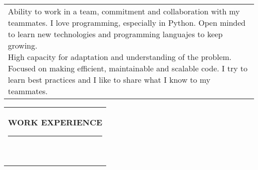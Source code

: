 \documentclass[10pt,A4]{article}
\newcommand{\mpwidth}{\linewidth-\fboxsep-\fboxsep}
\newcommand{\cvtext}[1] {
        \begin{tabular*}{1\mpwidth}{p{0.98\mpwidth}}
                \parbox{1\mpwidth}{#1}
        \end{tabular*}
}
\newcommand{\cvsection}[1] {
        \vspace{14pt}
        \cvtext{
                \textbf{\LARGE{\textcolor{darkcol}{\uppercase{#1}}}}\\[-4pt]
                \textcolor{maincol}{ \rule{0.1\textwidth}{2pt} } \\
        }
}
\begin{document}
\begin{paracol}{2}
\begin{rightcolumn}
\cvtext{Ability to work in a team, commitment and collaboration with my teammates. I love programming, especially in Python.
Open minded to learn new technologies and programming languajes to keep growing.\\

High capacity for adaptation and understanding of the problem. Focused on making efficient, maintainable and scalable code. I try to learn best practices and I like to share what I know to my teammates.\\

}

\vfill\null
\cvsection{WORK EXPERIENCE}


\end{rightcolumn}
\end{paracol}
\end{document}
